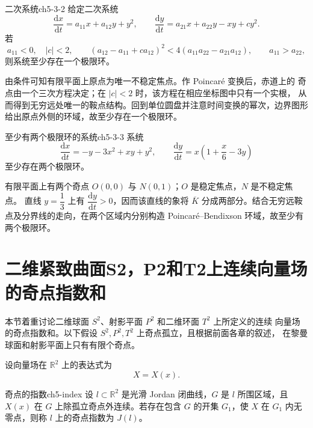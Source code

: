 
\begin{example}{二次系统}{ch5-3-2}
给定二次系统
\[
  \dfrac{\mathrm{d}x}{\mathrm{d}t}=a_{11}x+a_{12}y+y^2,\qquad
  \dfrac{\mathrm{d}y}{\mathrm{d}t}=a_{21}x+a_{22}y-xy+cy^2. \tag{3.4}
\]
若
\[
  a_{11}<0,\quad |c|<2,\qquad
  (a_{12}-a_{11}+ca_{12})^2<4(a_{11}a_{22}-a_{21}a_{12}),\qquad
  a_{11}>a_{22},
\]
则系统至少存在一个极限环。
\end{example}
\begin{solution}
由条件可知有限平面上原点为唯一不稳定焦点。作 Poincar\'e 变换后，赤道上的
奇点由一个三次方程决定；在 $|c|<2$ 时，该方程在相应坐标图中只有一个实根，
从而得到无穷远处唯一的鞍点结构。回到单位圆盘并注意时间变换的幂次，边界图形
给出原点外侧的环域，故至少存在一个极限环。
\end{solution}


\begin{example}{至少有两个极限环的系统}{ch5-3-3}
系统
\[
  \dfrac{\mathrm{d}x}{\mathrm{d}t}=-y-3x^2+xy+y^2,\qquad
  \dfrac{\mathrm{d}y}{\mathrm{d}t}=x\left(1+\dfrac{x}{6}-3y\right)
\]
至少存在两个极限环。
\end{example}

有限平面上有两个奇点 $O(0,0)$ 与 $N(0,1)$；$O$ 是稳定焦点，$N$ 是不稳定焦点。
直线 $y=\dfrac13$ 上有 $\dfrac{\mathrm{d}y}{\mathrm{d}t}>0$，因而该直线的象将
$\overline K$ 分成两部分。结合无穷远鞍点及分界线的走向，在两个区域内分别构造
Poincar\'e--Bendixson 环域，故至少有两个极限环。


\section{二维紧致曲面S2，P2和T2上连续向量场的奇点指数和}

本节着重讨论二维球面 $S^2$、射影平面 $P^2$ 和二维环面 $T^2$ 上所定义的连续
向量场的奇点指数和。以下假设 $S^2,P^2,T^2$ 上奇点孤立，且根据前面各章的叙述，
在黎曼球面和射影平面上只有有限个奇点。

设向量场在 $\mathbb R^2$ 上的表达式为
\[
  X=X(x). \tag{4.1}
\]

\begin{definition}{奇点的指数}{ch5-index}
设 $l\subset\mathbb R^2$ 是光滑 Jordan 闭曲线，$G$ 是 $l$ 所围区域，且
$X(x)$ 在 $G$ 上除孤立奇点外连续。若存在包含 $G$ 的开集 $G_1$，使 $X$ 在
$G_1$ 内无零点，则称 $l$ 上的奇点指数为 $J(l)$。
\end{definition}

